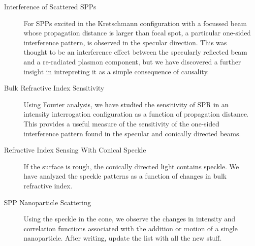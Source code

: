 \begin{description}
\item[{Interference of Scattered SPPs}]
For SPPs excited in the Kretschmann configuration with a focussed beam
whose propagation distance is larger than focal spot, a particular one-sided
interference pattern, is observed in the specular direction.  This was
thought to be an interference effect between the specularly reflected beam
and a re-radiated plasmon component, but we have discovered a further
insight in intrepreting it as a simple consequence of causality.
\item[{Bulk Refractive Index Sensitivity}] 
Using Fourier analysis, we have studied the sensitivity of SPR in an intensity
interrogation configuration as a function of propagation distance.  This
provides a useful measure of the sensitivity of the one-sided interference
pattern found in the specular and conically directed beams.
\item[{Refractive Index Sensing With Conical Speckle}]
If the surface is rough, the conically directed light contains speckle.  We
have analyzed the speckle patterns as a function of changes in bulk
refractive index.
\item[{SPP Nanoparticle Scattering}]
Using the speckle in the cone, we observe the changes in intensity and
correlation functions associated with the addition or motion of a single
nanoparticle.
After writing, update the list with all the new stuff.
\end{description}
